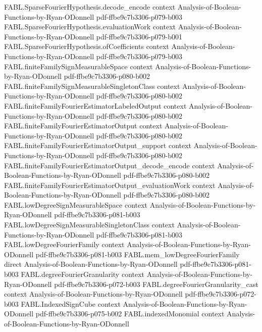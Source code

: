 \begin{theorem}
\proofstep
  {FABL.SparseFourierHypothesis.decode_encode}
  {context}
  {Analysis-of-Boolean-Functions-by-Ryan-ODonnell}
  {pdf-ffbe9c7b3306-p079-b003}
\proofstep
  {FABL.SparseFourierHypothesis.evaluationWork}
  {context}
  {Analysis-of-Boolean-Functions-by-Ryan-ODonnell}
  {pdf-ffbe9c7b3306-p079-b001}
\proofstep
  {FABL.SparseFourierHypothesis.ofCoefficients}
  {context}
  {Analysis-of-Boolean-Functions-by-Ryan-ODonnell}
  {pdf-ffbe9c7b3306-p079-b003}
\proofstep
  {FABL.finiteFamilySignMeasurableSpace}
  {context}
  {Analysis-of-Boolean-Functions-by-Ryan-ODonnell}
  {pdf-ffbe9c7b3306-p080-b002}
\proofstep
  {FABL.finiteFamilySignMeasurableSingletonClass}
  {context}
  {Analysis-of-Boolean-Functions-by-Ryan-ODonnell}
  {pdf-ffbe9c7b3306-p080-b002}
\proofstep
  {FABL.finiteFamilyFourierEstimatorLabeledOutput}
  {context}
  {Analysis-of-Boolean-Functions-by-Ryan-ODonnell}
  {pdf-ffbe9c7b3306-p080-b002}
\proofstep
  {FABL.finiteFamilyFourierEstimatorOutput}
  {context}
  {Analysis-of-Boolean-Functions-by-Ryan-ODonnell}
  {pdf-ffbe9c7b3306-p080-b002}
\proofstep
  {FABL.finiteFamilyFourierEstimatorOutput_support}
  {context}
  {Analysis-of-Boolean-Functions-by-Ryan-ODonnell}
  {pdf-ffbe9c7b3306-p080-b002}
\proofstep
  {FABL.finiteFamilyFourierEstimatorOutput_decode_encode}
  {context}
  {Analysis-of-Boolean-Functions-by-Ryan-ODonnell}
  {pdf-ffbe9c7b3306-p080-b002}
\proofstep
  {FABL.finiteFamilyFourierEstimatorOutput_evaluationWork}
  {context}
  {Analysis-of-Boolean-Functions-by-Ryan-ODonnell}
  {pdf-ffbe9c7b3306-p080-b002}
\proofstep
  {FABL.lowDegreeSignMeasurableSpace}
  {context}
  {Analysis-of-Boolean-Functions-by-Ryan-ODonnell}
  {pdf-ffbe9c7b3306-p081-b003}
\proofstep
  {FABL.lowDegreeSignMeasurableSingletonClass}
  {context}
  {Analysis-of-Boolean-Functions-by-Ryan-ODonnell}
  {pdf-ffbe9c7b3306-p081-b003}
\proofstep
  {FABL.lowDegreeFourierFamily}
  {context}
  {Analysis-of-Boolean-Functions-by-Ryan-ODonnell}
  {pdf-ffbe9c7b3306-p081-b003}
\proofstep
  {FABL.mem_lowDegreeFourierFamily}
  {direct}
  {Analysis-of-Boolean-Functions-by-Ryan-ODonnell}
  {pdf-ffbe9c7b3306-p081-b003}
\proofstep
  {FABL.degreeFourierGranularity}
  {context}
  {Analysis-of-Boolean-Functions-by-Ryan-ODonnell}
  {pdf-ffbe9c7b3306-p072-b003}
\proofstep
  {FABL.degreeFourierGranularity_cast}
  {context}
  {Analysis-of-Boolean-Functions-by-Ryan-ODonnell}
  {pdf-ffbe9c7b3306-p072-b003}
\proofstep
  {FABL.IndexedSignCube}
  {context}
  {Analysis-of-Boolean-Functions-by-Ryan-ODonnell}
  {pdf-ffbe9c7b3306-p075-b002}
\proofstep
  {FABL.indexedMonomial}
  {context}
  {Analysis-of-Boolean-Functions-by-Ryan-ODonnell}

\end{theorem}
